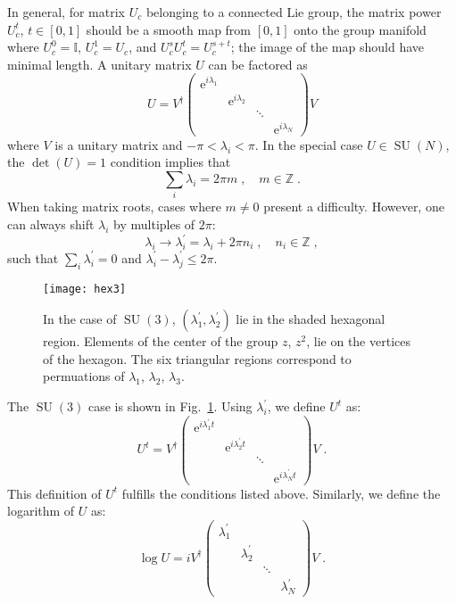 \documentclass[preprint,aps,prd]{revtex4-2}
\newcommand{\da}{\dagger}  %
\newcommand{\be}{\begin{equation}}
\newcommand{\eq}{\end{equation}}
\newcommand{\integer}{\mathbb{Z}}       %
\DeclareMathOperator{\SU}{SU}
\begin{document}
In general, for matrix $U_c$ belonging to a connected Lie group,
the matrix power $U_c^t$, $t\in[0,1]$ should be a
smooth map from $[0,1]$ onto the group manifold where
$U_c^0=\mathbb{I}$, $U_c^1=U_c$, and $U_c^s U_c^t = U_c^{s+t}$;
the image of the map should have minimal length.
A unitary matrix $U$ can be factored as
%
\be
U = V^\da \begin{pmatrix}
    \mathrm{e}^{i \lambda_1} & & &\\
    & \mathrm{e}^{i \lambda_2} & &\\
    & & \ddots & \\
    & & & \mathrm{e}^{i \lambda_N}\end{pmatrix} V
\eq
%
where $V$ is a unitary matrix and $-\pi < \lambda_i < \pi$.
In the special case $U \in \SU(N)$, the $\det(U)=1$ condition implies that
\be
\sum_i \lambda_i = 2 \pi m\;, \quad m\in\integer \;.
\eq
When taking matrix roots, cases where $m\neq 0$ present a
difficulty.  However, one can always shift $\lambda_i$ by
multiples of $2\pi$:
\be
\lambda_i \to \lambda_i^\prime = \lambda_i + 2 \pi n_i\;,\quad
n_i\in\integer \; ,
\eq
such that $\sum_i \lambda_i^\prime = 0$ and
$\lambda_i^\prime - \lambda_j^\prime \le 2 \pi$.
%
\begin{figure}
\texttt{[image: hex3]}
  \caption{In the case of $\SU(3)$, $(\lambda_1^\prime,\lambda_2^\prime)$ lie in the shaded hexagonal region.
    Elements of the center of the group $z$, $z^2$, lie on the vertices of the hexagon. The six triangular regions correspond to permuations of $\lambda_1$, $\lambda_2$, $\lambda_3$.   \label{hexagon}}
\end{figure}
%
The $\SU(3)$ case is shown in Fig.~\ref{hexagon}.
Using $\lambda_i^\prime$, we define $U^t$ as:
\be
U^t = V^\da \begin{pmatrix}
    \mathrm{e}^{i\lambda_1^\prime t} & & &\\
    & \mathrm{e}^{i\lambda_2^\prime t} & &\\
    & & \ddots & \\
    & & & \mathrm{e}^{i\lambda_N^\prime t}\end{pmatrix} V \; .
\eq
This definition of $U^t$ fulfills the conditions listed above.
Similarly, we define the logarithm of $U$ as:
\be
\log U = i V^\da \begin{pmatrix}
    \lambda_1^\prime & & &\\
    & \lambda_2^\prime & &\\
    & & \ddots & \\
    & & & \lambda_N^\prime\end{pmatrix} V \; .
\eq
\end{document}
